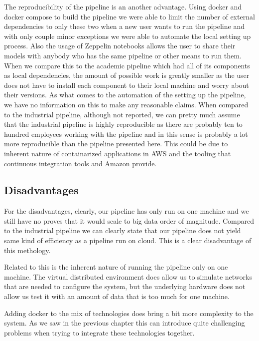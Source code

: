 The reproducibility of the pipeline is an another advantage.
Using docker and docker compose to build the pipeline we were able to limit the number of external dependencies to only these two when a new user wants to run the pipeline and with only couple minor exceptions we were able to automate the local setting up process.
Also the usage of Zeppelin notebooks allows the user to share their models with anybody who has the same pipeline or other means to run them.
When we compare this to the academic pipeline which had all of its components as local dependencies, the amount of possible work is greatly smaller as the user does not have to install each component to their local machine and worry about their versions.
As what comes to the automation of the setting up the pipeline, we have no information on this to make any reasonable claims.
When compared to the industrial pipeline, although not reported, we can pretty much assume that the industrial pipeline is highly reproducible as there are probably ten to hundred employees working with the pipeline and in this sense is probably a lot more reproducible than the pipeline presented here.
This could be due to inherent nature of containarized applications in AWS and the tooling that continuous integration tools and Amazon provide.

\subsection{Disadvantages}

For the disadvantages, clearly, our pipeline has only run on one machine and we still have no proves that it would scale to big data order of magnitude.
Compared to the industrial pipeline we can clearly state that our pipeline does not yield same kind of efficiency as a pipeline run on cloud.
This is a clear disadvantage of this methology.

Related to this is the inherent nature of running the pipeline only on one machine.
The virtual distributed environment does allow us to simulate networks that are needed to configure the system, but the underlying hardware does not allow us test it with an amount of data that is too much for one machine.

Adding docker to the mix of technologies does bring a bit more complexity to the system.
As we saw in the previous chapter this can introduce quite challenging problems when trying to integrate these technologies together.



